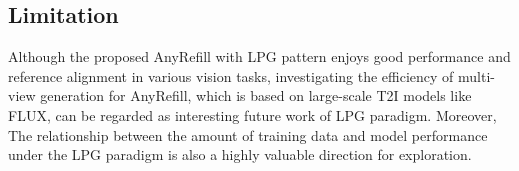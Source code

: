 \subsection{Limitation}
\label{sec:limitation}
Although the proposed AnyRefill with LPG pattern enjoys good performance and reference alignment in various vision tasks, investigating the efficiency of multi-view generation for AnyRefill, which is based on large-scale T2I models like FLUX, can be regarded as interesting future work of LPG paradigm.
Moreover, The relationship between the amount of training data and model performance under the LPG paradigm is also a highly valuable direction for exploration.



